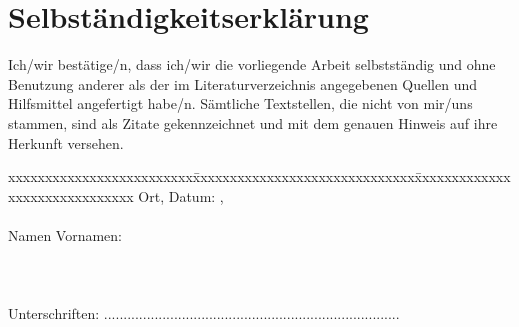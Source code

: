 \chapter*{Selbständigkeitserklärung}
\label{chap:selbstaendigkeitserklaerung}

\vspace*{10mm} 

Ich/wir bestätige/n, dass ich/wir die vorliegende Arbeit selbstständig und ohne Benutzung anderer als der im Literaturverzeichnis angegebenen Quellen und Hilfsmittel angefertigt habe/n. Sämtliche Textstellen, die nicht von mir/uns stammen, sind als Zitate gekennzeichnet und mit dem genauen Hinweis auf ihre Herkunft versehen. 

\vspace{15mm}

\begin{tabbing}
xxxxxxxxxxxxxxxxxxxxxxxxx\=xxxxxxxxxxxxxxxxxxxxxxxxxxxxxx\=xxxxxxxxxxxxxxxxxxxxxxxxxxxxxx\kill
Ort, Datum:		, \versiondate \\ \\ 
Namen Vornamen:	 	 \\ \\ \\ \\ 
Unterschriften:	\>......................................\>......................................\\
\end{tabbing}
